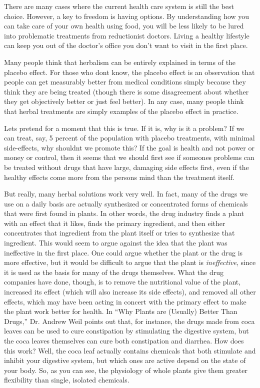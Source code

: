 There are many cases where the current health care system is still the
best choice. However, a key to freedom is having options. By
understanding how you can take care of your own health using food, you
will be less likely to be lured into problematic treatments from
reductionist doctors. 
Living a healthy
lifestyle can keep you out of the doctor’s office you don’t want to
visit in the first place.

\begin{infonote}
Many people think that herbalism can be entirely explained in terms of
the placebo effect. For those who don{\textquotesingle}t know, the
placebo effect is an observation that people can get measurably better
from medical conditions simply because they think they are being
treated (though there is some disagreement about whether they get
objectively better or just feel better). In any case, many people think
that herbal treatments are simply examples of the placebo effect in
practice. 

Let{\textquotesingle}s pretend for a moment that this is true. If
it is, why is
it a problem?  If we
can treat, say, 5 percent of the population with placebo treatments,
with minimal side-effects, why shouldn{\textquotesingle}t we promote
this?  If the goal is health and not power or money or control, then it
seems that we should first see if someone{\textquotesingle}s problems
can be treated without drugs
that have large,
damaging side effects first, even if the healthy effects come more from
the person{\textquotesingle}s mind than the treatment itself.

But really, many herbal solutions work very well.  In fact, many of the
drugs we use on a daily basis are actually synthesized or concentrated
forms of chemicals that were first found in plants. In other words, the
drug industry finds a plant with an effect that it likes, finds the
primary ingredient, and then either concentrates that ingredient from
the plant itself or tries to synthesize that ingredient.  This would
seem to argue against the idea that the plant was ineffective in the
first place. One could argue whether the plant or the drug is more
effective, but it would be difficult to argue that the plant is
\textit{ineffective}, since it is used as the basis for many of the
drugs themselves.  What the drug companies have done, though, is to
remove the nutritional value of the plant, increased its effect (which
will also increase its side effects), and removed all other effects,
which may have been acting in concert with the primary effect to make
the plant work better for health.  In “Why Plants are (Usually) Better
Than Drugs,” Dr. Andrew Weil points out that, for instance, the drugs
made from coca leaves can be used to cure constipation by stimulating
the digestive system, but the coca leaves themselves can cure both
constipation and diarrhea.  How does this work?  Well, the coca leaf
actually contains chemicals that both stimulate and inhibit your
digestive system, but which ones are active depend on the state of your
body.  So, as you can see, the physiology of whole plants give them
greater flexibility than single, isolated chemicals. 


\end{infonote}
